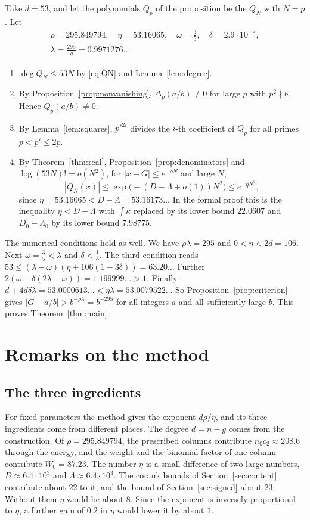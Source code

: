 \documentclass[11pt]{amsart}
\newcommand{\Rho}{295.849794}
\newcommand{\EtaTot}{53.16065}
\newcommand{\LamCrit}{0.9971276}
\newcommand{\EtaExact}{53.16173}
\newcommand{\PayL}{53.0000613}
\newcommand{\PayR}{53.0079522}
\newcommand{\ChiLean}{22.0607}
\theoremstyle{definition}
\theoremstyle{remark}
\numberwithin{equation}{section}
\begin{document}
Take $d=53$, and let the polynomials $Q_p$ of the proposition be the $Q_N$ with $N=p$. Let
\begin{gather*}
 \rho=\Rho,\quad \eta=\EtaTot,\quad \omega=\tfrac35,\quad \delta=2.9\cdot10^{-7},\\
 \lambda=\frac{295}{\rho}=\LamCrit\ldots
\end{gather*}
\begin{enumerate}[label=(\alph*)]
\item $\deg Q_N\le53N$ by \eqref{eq:QN} and Lemma~\ref{lem:degree}.
\item By Proposition~\ref{prop:nonvanishing}, $\Delta_p(a/b)\ne0$ for large $p$ with $p^2\nmid b$. Hence
$Q_p(a/b)\ne0$.
\item By Lemma~\ref{lem:squares}, $p'^{2i}$ divides the $i$-th coefficient of $Q_p$ for all primes
$p<p'\le2p$.
\item By Theorem~\ref{thm:real}, Proposition~\ref{prop:denominators} and $\log(53N)!=o(N^2)$, for
$|x-G|\le e^{-\rho N}$ and large $N$,
\[
 |Q_N(x)|\le\exp\bigl(-(D-\Lambda+o(1))N^2\bigr)\le e^{-\eta N^2},
\]
since $\eta=\EtaTot<D-\Lambda=\EtaExact\ldots$ In the formal proof this is the inequality $\eta<D-\Lambda$ with
$\int\kappa$ replaced by its lower bound $\ChiLean$ and $D_0-\Lambda_0$ by its lower bound $7.98775$.
\end{enumerate}
The numerical conditions hold as well. We have $\rho\lambda=295$ and $0<\eta<2d=106$. Next $\omega=\frac35<\lambda$ and
$\delta<\frac13$. The third condition reads $53\le(\lambda-\omega)(\eta+106(1-3\delta))=63.20\ldots$ Further
$2(\omega-\delta(2\lambda-\omega))=1.199999\ldots>1$. Finally
$d+4d\delta\lambda=\PayL\ldots<\eta\lambda=\PayR\ldots$ So Proposition~\ref{prop:criterion} gives
$|G-a/b|>b^{-\rho\lambda}=b^{-295}$ for all integers $a$ and all sufficiently large $b$. This proves
Theorem~\ref{thm:main}.

\section{Remarks on the method}\label{sec:remarks}

\subsection{The three ingredients}
For fixed parameters the method gives the exponent $d\rho/\eta$, and its three ingredients come from
different places. The degree $d=n-g$ comes from the construction. Of $\rho=\Rho$, the prescribed columns
contribute $n_0c_2\approx208.6$ through the energy, and the weight and the binomial factor of one column
contribute $W_0=87.23$. The number $\eta$ is a small difference of two large numbers, $D\approx6.4\cdot10^3$ and
$\Lambda\approx6.4\cdot10^3$. The corank bounds of Section~\ref{sec:content} contribute about $22$ to it, and the
bound of Section~\ref{sec:signed} about $23$. Without them $\eta$ would be about $8$. Since the exponent
is inversely proportional to $\eta$, a further gain of $0.2$ in $\eta$ would lower it by about $1$.
\end{document}
